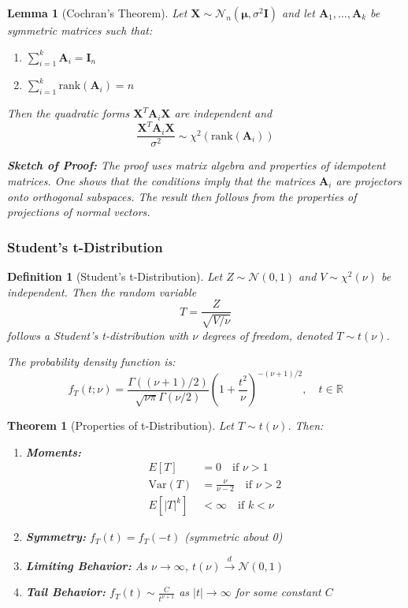 \documentclass[12pt,a4paper]{article}
\newtheorem{theorem}{Theorem}[section]
\newtheorem{definition}{Definition}[section]
\newtheorem{lemma}{Lemma}[section]
\theoremstyle{remark}
\begin{document}
\begin{lemma}[Cochran's Theorem]
Let $\mathbf{X} \sim \mathcal{N}_n(\boldsymbol{\mu}, \sigma^2\mathbf{I})$ and let $\mathbf{A}_1, \ldots, \mathbf{A}_k$ be symmetric matrices such that:
\begin{enumerate}
\item $\sum_{i=1}^k \mathbf{A}_i = \mathbf{I}_n$
\item $\sum_{i=1}^k \text{rank}(\mathbf{A}_i) = n$
\end{enumerate}
Then the quadratic forms $\mathbf{X}^T\mathbf{A}_i\mathbf{X}$ are independent and 
$$\frac{\mathbf{X}^T\mathbf{A}_i\mathbf{X}}{\sigma^2} \sim \chi^2(\text{rank}(\mathbf{A}_i))$$

\textbf{Sketch of Proof:} The proof uses matrix algebra and properties of idempotent matrices. One shows that the conditions imply that the matrices $\mathbf{A}_i$ are projectors onto orthogonal subspaces. The result then follows from the properties of projections of normal vectors.
\end{lemma}

\subsubsection{Student's t-Distribution}

\begin{definition}[Student's t-Distribution]
Let $Z \sim \mathcal{N}(0,1)$ and $V \sim \chi^2(\nu)$ be independent. Then the random variable
$$T = \frac{Z}{\sqrt{V/\nu}}$$
follows a Student's t-distribution with $\nu$ degrees of freedom, denoted $T \sim t(\nu)$.

The probability density function is:
$$f_T(t; \nu) = \frac{\Gamma((\nu+1)/2)}{\sqrt{\nu\pi}\Gamma(\nu/2)} \left(1 + \frac{t^2}{\nu}\right)^{-(\nu+1)/2}, \quad t \in \mathbb{R}$$
\end{definition}

\begin{theorem}[Properties of t-Distribution]
Let $T \sim t(\nu)$. Then:
\begin{enumerate}
\item \textbf{Moments:}
   \begin{align}
   E[T] &= 0 \quad \text{if } \nu > 1\\
   \text{Var}(T) &= \frac{\nu}{\nu-2} \quad \text{if } \nu > 2\\
   E[|T|^k] &< \infty \quad \text{if } k < \nu
   \end{align}
\item \textbf{Symmetry:} $f_T(t) = f_T(-t)$ (symmetric about 0)
\item \textbf{Limiting Behavior:} As $\nu \to \infty$, $t(\nu) \stackrel{d}{\to} \mathcal{N}(0,1)$
\item \textbf{Tail Behavior:} $f_T(t) \sim \frac{C}{t^{\nu+1}}$ as $|t| \to \infty$ for some constant $C$
\end{enumerate}
\end{theorem}
\end{document}
